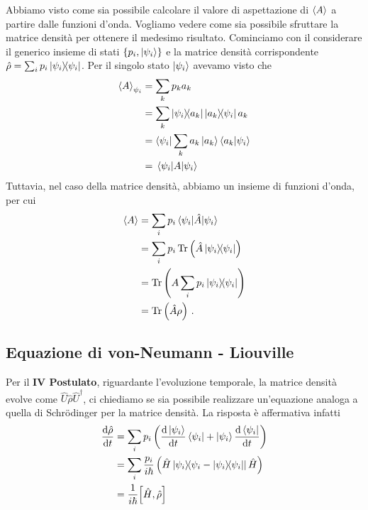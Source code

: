 \vspace{1cm}
\newline
{}
\vspace{0.5cm}
\noindent Abbiamo visto come sia possibile calcolare il valore di aspettazione di $\expval{A}$ a partire dalle funzioni d'onda. Vogliamo vedere come sia possibile sfruttare la matrice densità per ottenere il medesimo risultato. Cominciamo con il considerare il generico insieme di stati $\{p_i, \ket{\psi_i}\}$ e la matrice densità corrispondente $\hat \rho=\sum_i p_i\op{\psi_i}{\psi_i}$. Per il singolo stato $\ket{\psi_i}$ avevamo visto che
\begin{equation*}
    \begin{aligned}
        \expval{A}_{\psi_i} &= \sum_k p_k a_k \\
                            &= \sum_k \op{\psi_i}{a_k}\op{a_k}{\psi_i}a_k \\
                            &= \bra{\psi_i}\sum_k a_k \ket{a_k}\ip{a_k}{\psi_i} \\
                            &= \expval{A}{\psi_i}
    \end{aligned}
\end{equation*}
Tuttavia, nel caso della matrice densità, abbiamo un insieme di funzioni d'onda, per cui
\begin{equation*}
    \begin{aligned}
        \expval{A} &= \sum_i p_i \expval{\hat A}{\psi_i} \\
                   &= \sum_i p_i \Tr \left(\hat A\op{\psi_i}{\psi_i}\right) \\
                   &= \Tr \left(A\sum_i p_i \op{\psi_i}{\psi_i}\right) \\
                   &= \Tr\left(\hat A\rho\right) \, .
    \end{aligned}
\end{equation*}

\subsection*{Equazione di von-Neumann - Liouville}
Per il \textbf{IV Postulato}, riguardante l'evoluzione temporale, la matrice densità evolve come $\hat U \hat \rho \hat U^\dagger$, ci chiediamo se sia possibile realizzare un'equazione analoga a quella di Schrödinger per la matrice densità. La risposta è affermativa infatti
\begin{equation*}
    \begin{aligned}
        \derivative{\hat \rho}{t} &= \sum_i p_i\left(\derivative{\ket{\psi_i}}{t}\bra{\psi_i}+\ket{\psi_i}\derivative{\bra{\psi_i}}{t}\right) \\
                                  &= \sum_i \frac{p_i}{i\hbar}\left(\hat H \op{\psi_i}{\psi_i-\op{\psi_i}{\psi_i}}\hat H\right) \\
                                  &= \frac{1}{i\hbar}\comm{\hat H}{\hat \rho}
    \end{aligned}
\end{equation*}

